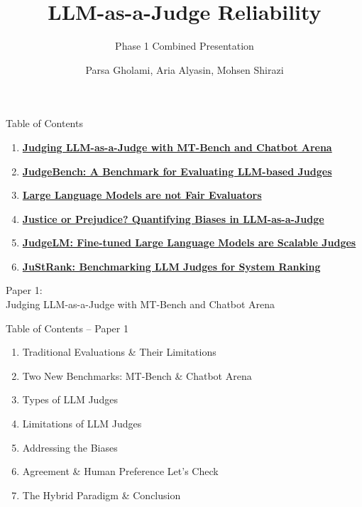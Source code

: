 \documentclass[10pt]{beamer}
\title{LLM-as-a-Judge Reliability}
\subtitle{Phase 1 Combined Presentation}
\date{}
\author{Parsa Gholami, Aria Alyasin, Mohsen Shirazi}
\institute{Sharif University of Technology}
\begin{document}
\maketitle
\begin{frame}{Table of Contents}
  \begin{enumerate}
    \item \hyperlink{paper1}{\textbf{Judging LLM-as-a-Judge with MT-Bench and Chatbot Arena}}
    \item \hyperlink{paper2}{\textbf{JudgeBench: A Benchmark for Evaluating LLM-based Judges}}
    \item \hyperlink{paper4}{\textbf{Large Language Models are not Fair Evaluators}}
    \item \hyperlink{paper3}{\textbf{Justice or Prejudice? Quantifying Biases in LLM-as-a-Judge}}
    \item \hyperlink{paper5}{\textbf{JudgeLM: Fine-tuned Large Language Models are Scalable Judges}}
    \item \hyperlink{paper6}{\textbf{JuStRank: Benchmarking LLM Judges for System Ranking}}
  \end{enumerate}
\end{frame}


\begin{frame}[standout]
  \hypertarget{paper1}{}
  \Large Paper 1:\\Judging LLM-as-a-Judge with MT-Bench and Chatbot Arena
\end{frame}

\begin{frame}{Table of Contents -- Paper 1}
  \begin{enumerate}
    \item Traditional Evaluations \& Their Limitations
    \item Two New Benchmarks: MT-Bench \& Chatbot Arena
    \item Types of LLM Judges
    \item Limitations of LLM Judges
    \item Addressing the Biases
    \item Agreement \& Human Preference Let's Check
    \item The Hybrid Paradigm \& Conclusion
  \end{enumerate}
\end{frame}
\end{document}
